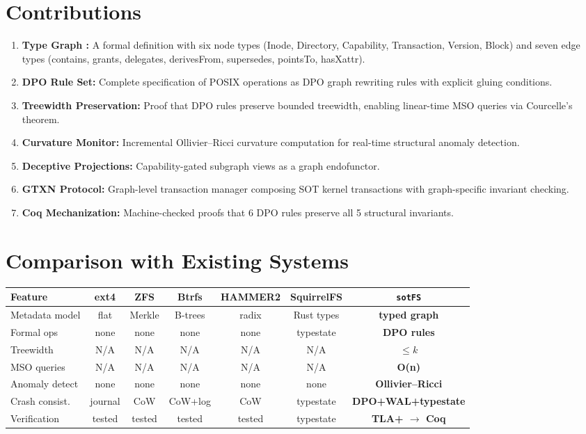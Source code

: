 \documentclass[11pt,a4paper,twoside]{report}
\theoremstyle{definition}
\newcommand{\sotFS}{\texttt{sotFS}}
\newcommand{\TG}{\mathrm{TG}}
\begin{document}
\section{Contributions}
\begin{enumerate}
\item \textbf{Type Graph \TG{}:} A formal definition with six node types
  (Inode, Directory, Capability, Transaction, Version, Block) and seven
  edge types (contains, grants, delegates, derivesFrom, supersedes,
  pointsTo, hasXattr).
\item \textbf{DPO Rule Set:} Complete specification of POSIX operations as
  DPO graph rewriting rules with explicit gluing conditions.
\item \textbf{Treewidth Preservation:} Proof that DPO rules preserve bounded
  treewidth, enabling linear-time MSO queries via Courcelle's theorem.
\item \textbf{Curvature Monitor:} Incremental Ollivier--Ricci curvature
  computation for real-time structural anomaly detection.
\item \textbf{Deceptive Projections:} Capability-gated subgraph views as a
  graph endofunctor.
\item \textbf{GTXN Protocol:} Graph-level transaction manager composing SOT
  kernel transactions with graph-specific invariant checking.
\item \textbf{Coq Mechanization:} Machine-checked proofs that 6 DPO rules
  preserve all 5 structural invariants.
\end{enumerate}

\section{Comparison with Existing Systems}

\begin{center}\small
\begin{tabular}{lcccccc}
\toprule
\textbf{Feature} & \textbf{ext4} & \textbf{ZFS} & \textbf{Btrfs} & \textbf{HAMMER2} & \textbf{SquirrelFS} & \textbf{\sotFS{}} \\
\midrule
Metadata model & flat & Merkle & B-trees & radix & Rust types & \textbf{typed graph} \\
Formal ops     & none & none   & none    & none  & typestate  & \textbf{DPO rules} \\
Treewidth      & N/A  & N/A    & N/A     & N/A   & N/A        & \textbf{$\leq k$} \\
MSO queries    & N/A  & N/A    & N/A     & N/A   & N/A        & \textbf{O(n)} \\
Anomaly detect & none & none   & none    & none  & none       & \textbf{Ollivier--Ricci} \\
Crash consist. & journal & CoW & CoW+log & CoW   & typestate  & \textbf{DPO+WAL+typestate} \\
Verification   & tested & tested & tested & tested & typestate & \textbf{TLA+ $\to$ Coq} \\
\bottomrule
\end{tabular}
\end{center}
\end{document}
